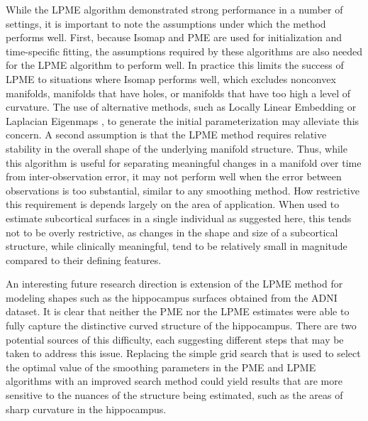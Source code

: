 \documentclass[12pt]{article}
\theoremstyle{definition}
\begin{document}
While the LPME algorithm demonstrated strong performance in a number of settings, it is important to note the assumptions under which the method performs well. First, because Isomap and PME are used for initialization and time-specific fitting, the assumptions required by these algorithms are also needed for the LPME algorithm to perform well. In practice this limits the success of LPME to situations where Isomap performs well, which excludes nonconvex manifolds, manifolds that have holes, or manifolds that have too high a level of curvature. The use of alternative methods, such as Locally Linear Embedding \citep{roweis2000Nonlinear} or Laplacian Eigenmaps \citep{belkin2003laplacian}, to generate the initial parameterization may alleviate this concern. A second assumption is that the LPME method requires relative stability in the overall shape of the underlying manifold structure. Thus, while this algorithm is useful for separating meaningful changes in a manifold over time from inter-observation error, it may not perform well when the error between observations is too substantial, similar to any smoothing method. How restrictive this requirement is depends largely on the area of application. When used to estimate subcortical surfaces in a single individual as suggested here, this tends not to be overly restrictive, as changes in the shape and size of a subcortical structure, while clinically meaningful, tend to be relatively small in magnitude compared to their defining features.    

An interesting future research direction is extension of the LPME method for modeling  shapes such as the hippocampus surfaces obtained from the ADNI dataset. It is clear that neither the PME nor the LPME estimates were able to fully capture the distinctive curved structure of the hippocampus. There are two potential sources of this difficulty, each suggesting different steps that may be taken to address this issue. Replacing the simple grid search that is used to select the optimal value of the smoothing parameters in the PME and LPME algorithms with an improved search method could yield results that are more sensitive to the nuances of the structure being estimated, such as the areas of sharp curvature in the hippocampus.
\end{document}
